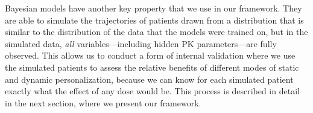 Bayesian models have another key property that we use in our framework. They are able to simulate the trajectories of patients drawn from a distribution that is similar to the distribution of the data that the models were trained on, but in the simulated data, \textit{all} variables---including hidden PK parameters---are fully observed. This allows us to conduct a form of internal validation where we use the simulated patients to assess the relative benefits of different modes of static and dynamic personalization, because we can know for each simulated patient exactly what the effect of any dose would be. This process is described in detail in the next section, where we present our framework.
